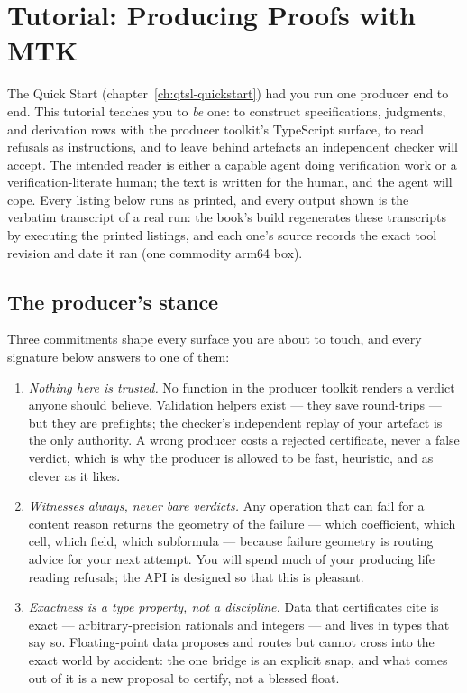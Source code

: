 \chapter{Tutorial: Producing Proofs with MTK}
\label{ch:qtsl-tutorial}

The Quick Start (chapter~\ref{ch:qtsl-quickstart}) had you run one
producer end to end. This tutorial teaches you to \emph{be} one: to
construct specifications, judgments, and derivation rows with the
producer toolkit's TypeScript surface, to read refusals as
instructions, and to leave behind artefacts an independent checker
will accept. The intended reader is either a capable agent doing
verification work or a verification-literate human; the text is
written for the human, and the agent will cope. Every listing below
runs as printed, and every output shown is the verbatim transcript of
a real run: the book's build regenerates these transcripts by
executing the printed listings, and each one's source records the
exact tool revision and date it ran (one commodity arm64 box).

\section{The producer's stance}
\label{sec:tut-stance}

Three commitments shape every surface you are about to touch, and
every signature below answers to one of them:

\begin{enumerate}
\item \emph{Nothing here is trusted.} No function in the producer
  toolkit renders a verdict anyone should believe. Validation helpers
  exist --- they save round-trips --- but they are preflights; the
  checker's independent replay of your artefact is the only
  authority. A wrong producer costs a rejected certificate, never a
  false verdict, which is why the producer is allowed to be fast,
  heuristic, and as clever as it likes.
\item \emph{Witnesses always, never bare verdicts.} Any operation
  that can fail for a content reason returns the geometry of the
  failure --- which coefficient, which cell, which field, which
  subformula --- because failure geometry is routing advice for your
  next attempt. You will spend much of your producing life reading
  refusals; the API is designed so that this is pleasant.
\item \emph{Exactness is a type property, not a discipline.} Data
  that certificates cite is exact --- arbitrary-precision rationals
  and integers --- and lives in types that say so. Floating-point
  data proposes and routes but cannot cross into the exact world by
  accident: the one bridge is an explicit snap, and what comes out of
  it is a new proposal to certify, not a blessed float.
\end{enumerate}


